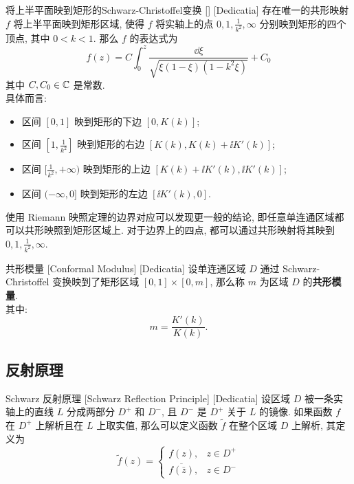         \begin{thm}
            {将上半平面映到矩形的Schwarz-Christoffel变换}
            []
            [Dedicatia]
            存在唯一的共形映射 \(f\) 将上半平面映到矩形区域, 使得 \(f\) 将实轴上的点 \(0,1,\frac{1}{k^2},\infty\) 分别映到矩形的四个顶点, 其中 \(0<k<1\). 那么 \(f\) 的表达式为
            \[f(z)=C\int_{0}^{z}\frac{\dd{\xi}}{\sqrt{\xi(1-\xi)(1-k^2\xi)}}+C_0\]
            其中 \(C,C_0\in\operatorname{\mathbb{C}}\) 是常数.\\
            具体而言:\begin{itemize}
                \item 区间 \([0,1]\) 映到矩形的下边 \([0,K(k)]\);
                \item 区间 \([1,\frac{1}{k^2}]\) 映到矩形的右边 \([K(k),K(k)+\ii K'(k)]\);
                \item 区间 \([\frac{1}{k^2},+\infty)\) 映到矩形的上边 \([K(k)+\ii K'(k),\ii K'(k)]\);
                \item 区间 \((-\infty,0]\) 映到矩形的左边 \([\ii K'(k),0]\).
            \end{itemize}
        \end{thm}

        \begin{rmk}
            [Dedicatia]
            使用 Riemann 映照定理的边界对应可以发现更一般的结论, 即任意单连通区域都可以共形映照到矩形区域上. 对于边界上的四点, 都可以通过共形映射将其映到 \(0,1,\frac{1}{k^2},\infty\).
        \end{rmk}

        \begin{dfn}
            {共形模量}
            [Conformal Modulus]
            [Dedicatia]
            设单连通区域 \(D\) 通过 Schwarz-Christoffel 变换映到了矩形区域 \([0,1]\times[0,m]\), 那么称 \(m\) 为区域 \(D\) 的\textbf{共形模量}.\\
            其中:
            \[m=\frac{K'(k)}{K(k)}.\]
        \end{dfn}
    
    \subsection{反射原理}

        \begin{thm}
            {Schwarz 反射原理}
            [Schwarz Reflection Principle]
            [Dedicatia]
            设区域 \(D\) 被一条实轴上的直线 \(L\) 分成两部分 \(D^+\) 和 \(D^-\), 且 \(D^-\) 是 \(D^+\) 关于 \(L\) 的镜像. 如果函数 \(f\) 在 \(D^+\) 上解析且在 \(L\) 上取实值, 那么可以定义函数 \(\tilde{f}\) 在整个区域 \(D\) 上解析, 其定义为
            \[\tilde{f}(z)=\begin{cases}
                f(z), & z\in D^+\\
                \overline{f(\bar{z})}, & z\in D^-
            \end{cases}\]
        \end{thm}

